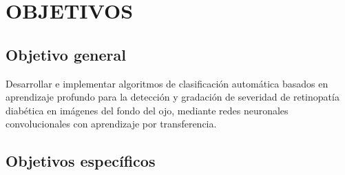 
\chapter{OBJETIVOS} \label{chap:objetivos}

\section*{Objetivo general}

Desarrollar e implementar algoritmos de clasificación automática basados en aprendizaje profundo para la detección y gradación de severidad de retinopatía diabética en imágenes del fondo del ojo, mediante redes neuronales convolucionales con aprendizaje por transferencia.

\section*{Objetivos específicos}

